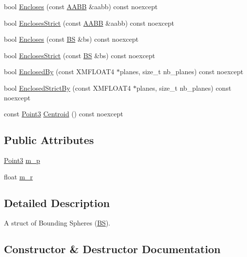 \begin{DoxyCompactItemize}
\item 
bool \hyperlink{structmage_1_1_b_s_ac646d715cc59c4ac7c324696fbf00ba8}{Encloses} (const \hyperlink{structmage_1_1_a_a_b_b}{A\+A\+BB} \&aabb) const noexcept
\item 
bool \hyperlink{structmage_1_1_b_s_a5172470cadb43af2015e351ab6d4e8b6}{Encloses\+Strict} (const \hyperlink{structmage_1_1_a_a_b_b}{A\+A\+BB} \&aabb) const noexcept
\item 
bool \hyperlink{structmage_1_1_b_s_a31ae3c4759efcdf7e101cae3a702dc00}{Encloses} (const \hyperlink{structmage_1_1_b_s}{BS} \&bs) const noexcept
\item 
bool \hyperlink{structmage_1_1_b_s_ab0692e25e9cfe45eb3c6003f5fc8de9f}{Encloses\+Strict} (const \hyperlink{structmage_1_1_b_s}{BS} \&bs) const noexcept
\item 
bool \hyperlink{structmage_1_1_b_s_a1ff87ce9addac9e2007820fef0cbf178}{Enclosed\+By} (const X\+M\+F\+L\+O\+A\+T4 $\ast$planes, size\+\_\+t nb\+\_\+planes) const noexcept
\item 
bool \hyperlink{structmage_1_1_b_s_ade043e08329585a850b1f897e75456c9}{Enclosed\+Strict\+By} (const X\+M\+F\+L\+O\+A\+T4 $\ast$planes, size\+\_\+t nb\+\_\+planes) const noexcept
\item 
const \hyperlink{structmage_1_1_point3}{Point3} \hyperlink{structmage_1_1_b_s_a18f360e81ee3acd3bad8d23bed4326e5}{Centroid} () const noexcept
\end{DoxyCompactItemize}
\subsection*{Public Attributes}
\begin{DoxyCompactItemize}
\item 
\hyperlink{structmage_1_1_point3}{Point3} \hyperlink{structmage_1_1_b_s_a6d63fae8fd20d26587ebd11efb1789d2}{m\+\_\+p}
\item 
float \hyperlink{structmage_1_1_b_s_a7a783b2ad117fc19a1caf548e3033df6}{m\+\_\+r}
\end{DoxyCompactItemize}


\subsection{Detailed Description}
A struct of Bounding Spheres (\hyperlink{structmage_1_1_b_s}{BS}). 

\subsection{Constructor \& Destructor Documentation}
\hypertarget{structmage_1_1_b_s_aa34921d9ea23b9a724ddf739b3adabfa}{}\label{structmage_1_1_b_s_aa34921d9ea23b9a724ddf739b3adabfa} 
